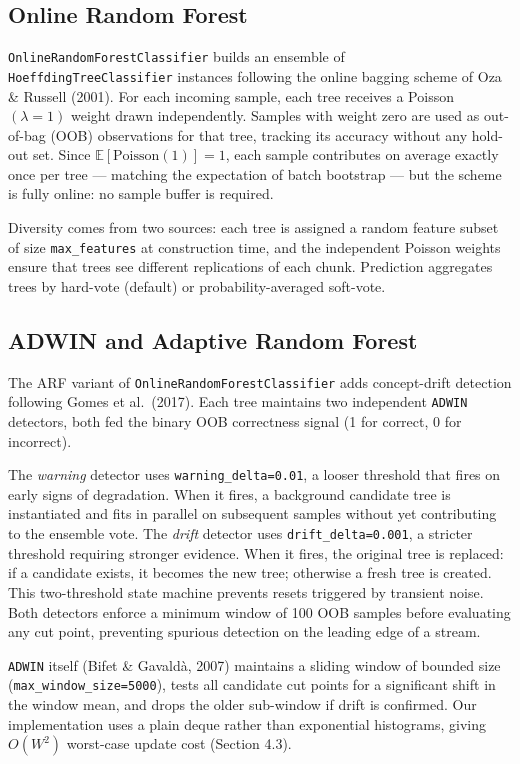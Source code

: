 \documentclass[10pt,a4paper]{article}
\begin{document}
\subsection{Online Random Forest}

\texttt{OnlineRandomForestClassifier} builds an ensemble of \texttt{HoeffdingTreeClassifier} instances following the online bagging scheme of Oza \& Russell (2001). For each incoming sample, each tree receives a Poisson$(\lambda=1)$ weight drawn independently. Samples with weight zero are used as out-of-bag (OOB) observations for that tree, tracking its accuracy without any hold-out set. Since $\mathbb{E}[\text{Poisson}(1)] = 1$, each sample contributes on average exactly once per tree --- matching the expectation of batch bootstrap --- but the scheme is fully online: no sample buffer is required.

Diversity comes from two sources: each tree is assigned a random feature subset of size \texttt{max\_features} at construction time, and the independent Poisson weights ensure that trees see different replications of each chunk. Prediction aggregates trees by hard-vote (default) or probability-averaged soft-vote.

\subsection{ADWIN and Adaptive Random Forest}

The ARF variant of \texttt{OnlineRandomForestClassifier} adds concept-drift detection following Gomes et al.\ (2017). Each tree maintains two independent \texttt{ADWIN} detectors, both fed the binary OOB correctness signal (1 for correct, 0 for incorrect).

The \emph{warning} detector uses \texttt{warning\_delta=0.01}, a looser threshold that fires on early signs of degradation. When it fires, a background candidate tree is instantiated and fits in parallel on subsequent samples without yet contributing to the ensemble vote. The \emph{drift} detector uses \texttt{drift\_delta=0.001}, a stricter threshold requiring stronger evidence. When it fires, the original tree is replaced: if a candidate exists, it becomes the new tree; otherwise a fresh tree is created. This two-threshold state machine prevents resets triggered by transient noise. Both detectors enforce a minimum window of 100 OOB samples before evaluating any cut point, preventing spurious detection on the leading edge of a stream.

\texttt{ADWIN} itself (Bifet \& Gavaldà, 2007) maintains a sliding window of bounded size (\texttt{max\_window\_size=5000}), tests all candidate cut points for a significant shift in the window mean, and drops the older sub-window if drift is confirmed. Our implementation uses a plain deque rather than exponential histograms, giving $O(W^2)$ worst-case update cost (Section 4.3).
\end{document}
